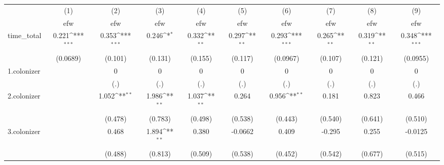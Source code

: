 {
\def\sym#1{\ifmmode^{#1}\else\(^{#1}\)\fi}
\begin{tabular}{l*{9}{c}}
\hline\hline
            &\multicolumn{1}{c}{(1)}&\multicolumn{1}{c}{(2)}&\multicolumn{1}{c}{(3)}&\multicolumn{1}{c}{(4)}&\multicolumn{1}{c}{(5)}&\multicolumn{1}{c}{(6)}&\multicolumn{1}{c}{(7)}&\multicolumn{1}{c}{(8)}&\multicolumn{1}{c}{(9)}\\
            &\multicolumn{1}{c}{efw}&\multicolumn{1}{c}{efw}&\multicolumn{1}{c}{efw}&\multicolumn{1}{c}{efw}&\multicolumn{1}{c}{efw}&\multicolumn{1}{c}{efw}&\multicolumn{1}{c}{efw}&\multicolumn{1}{c}{efw}&\multicolumn{1}{c}{efw}\\
\hline
time\_total  &       0.221\sym{***}&       0.353\sym{***}&       0.246\sym{*}  &       0.332\sym{**} &       0.297\sym{**} &       0.293\sym{***}&       0.265\sym{**} &       0.319\sym{**} &       0.348\sym{***}\\
            &    (0.0689)         &     (0.101)         &     (0.131)         &     (0.155)         &     (0.117)         &    (0.0967)         &     (0.107)         &     (0.121)         &    (0.0955)         \\
[1em]
1.colonizer &                     &           0         &           0         &           0         &           0         &           0         &           0         &           0         &           0         \\
            &                     &         (.)         &         (.)         &         (.)         &         (.)         &         (.)         &         (.)         &         (.)         &         (.)         \\
[1em]
2.colonizer &                     &       1.052\sym{**} &       1.986\sym{**} &       1.037\sym{**} &       0.264         &       0.956\sym{**} &       0.181         &       0.823         &       0.466         \\
            &                     &     (0.478)         &     (0.783)         &     (0.498)         &     (0.538)         &     (0.443)         &     (0.540)         &     (0.641)         &     (0.510)         \\
[1em]
3.colonizer &                     &       0.468         &       1.894\sym{**} &       0.380         &     -0.0662         &       0.409         &      -0.295         &       0.255         &     -0.0125         \\
            &                     &     (0.488)         &     (0.813)         &     (0.509)         &     (0.538)         &     (0.452)         &     (0.542)         &     (0.677)         &     (0.515)         \\

\end{tabular}}
